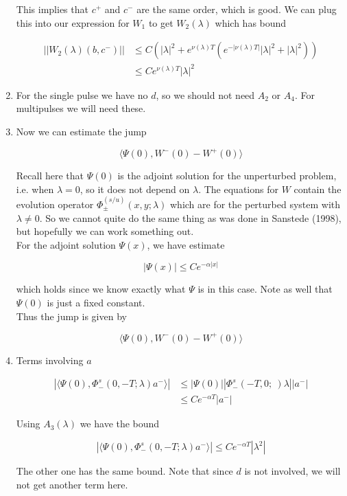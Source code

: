 \documentclass[12pt]{article}
\begin{document}
\begin{enumerate}
This implies that $c^+$ and $c^-$ are the same order, which is good. We can plug this into our expression for $W_1$ to get $W_2(\lambda)$ which has bound

\begin{align*}
||W_2(\lambda)(b,c^-)|| &\leq C (|\lambda|^2 + e^{\nu(\lambda)T}(e^{-|\nu(\lambda)T|} |\lambda|^2 + |\lambda|^2)) \\
&\leq C e^{\nu(\lambda)T} |\lambda|^2
\end{align*}

\item For the single pulse we have no $d$, so we should not need $A_2$ or $A_4$. For multipulses we will need these.

\item Now we can estimate the jump

\[
\langle \Psi(0), W^-(0) - W^+(0) \rangle 
\]

Recall here that $\Psi(0)$ is the adjoint solution for the unperturbed problem, i.e. when $\lambda = 0$, so it does not depend on $\lambda$. The equations for $W$ contain the evolution operator $\Phi^{(s/u)}_\pm(x, y; \lambda)$ which are for the perturbed system with $\lambda \neq 0$. So we cannot quite do the same thing as was done in Sanstede (1998), but hopefully we can work something out.\\

For the adjoint solution $\Psi(x)$, we have estimate 

\[
|\Psi(x)| \leq C e^{-\alpha|x|}
\]

which holds since we know exactly what $\Psi$ is in this case. Note as well that $\Psi(0)$ is just a fixed constant.\\

Thus the jump is given by

\[
\langle \Psi(0), W^-(0) - W^+(0) \rangle 
\]

\item Terms involving $a$

\begin{align*}
|\langle \Psi(0), \Phi^s_-(0, -T; \lambda )a^- \rangle| &\leq |\Psi(0)||\Phi^s_-(-T, 0; \
)\lambda||a^-| \\
&\leq C e^{-\alpha T} |a^-|
\end{align*}

Using $A_3(\lambda)$ we have the bound

\[
|\langle \Psi(0), \Phi^s_-(0, -T; \lambda )a^- \rangle| \leq C e^{-\alpha T} |\lambda^2|
\]

The other one has the same bound. Note that since $d$ is not involved, we will not get another term here.


\end{enumerate}
\end{document}
